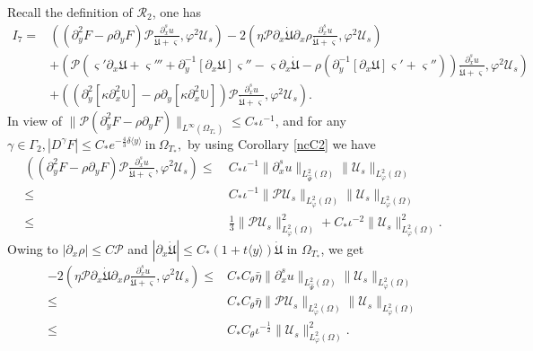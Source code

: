 \documentclass{amsart}
\numberwithin{equation}{section}
\newcommand\y{{{\langle y \rangle}}}
\begin{document}
Recall the definition of $\mathcal{R}_{2}$, one has
\begin{align}\label{I7}
I_{7}
=&\left((\partial_{y}^{2}F-\rho\partial_{y}F)\mathcal{P}\frac{\partial_{x}^{s}u}{\dot{\mathfrak{U}}+\varsigma},\varphi^{2}\mathcal{U}_{s}\right)
  -2\left(\eta\mathcal{P}\partial_{x}\dot{\mathfrak{U}}\partial_{x}\rho\frac{\partial_{x}^{s}u}{\dot{\mathfrak{U}}+\varsigma},\varphi^{2}\mathcal{U}_{s}\right)\\
 &+\left(\mathcal{P}\left(\varsigma'\partial_{x}\mathfrak{U}+\varsigma'''+\partial_{y}^{-1}[\partial_{x}\mathfrak{U}]\varsigma''-\varsigma\partial_{x}\dot{\mathfrak{U}}
  -\rho\left(\partial_{y}^{-1}[\partial_{x}\mathfrak{U}]\varsigma'+\varsigma''\right)\right)\frac{\partial_{x}^{s}u}{\dot{\mathfrak{U}}+\varsigma},\varphi^{2}\mathcal{U}_{s}\right)\nonumber\\
 &+\left((\partial_{y}^{2}[\kappa\partial_{x}^{2}\mathbb{U}]-\rho\partial_{y}[\kappa\partial_{x}^{2}\mathbb{U}])\mathcal{P}\frac{\partial_{x}^{s}u}{\dot{\mathfrak{U}}+\varsigma},\varphi^{2}\mathcal{U}_{s}\right).\nonumber
\end{align}
In view of $\|\mathcal{P}(\partial_{y}^{2}F-\rho\partial_{y}F)\|_{L^{\infty}(\Omega_{T_{*}})}\leq C_{*}\iota^{-1}$, and for any $\gamma\in\Gamma_{2}, |D^{\gamma}F|\leq C_{*}e^{-\frac{4}{3}\delta\y}~\text{in}~\Omega_{T_{*}},$
by using Corollary \ref{ncC2} we have
\begin{align}\label{I71}
\left((\partial_{y}^{2}F-\rho\partial_{y}F)\mathcal{P}\frac{\partial_{x}^{s}u}{\dot{\mathfrak{U}}+\varsigma},\varphi^{2}\mathcal{U}_{s}\right)
\leq&~C_{*}\iota^{-1}\|\partial_{x}^{s}u\|_{L_{\hat{\Psi}}^{2}(\Omega)}\|\mathcal{U}_{s}\|_{L_{\varphi}^{2}(\Omega)}\\
\leq&~C_{*}\iota^{-1}\|\mathcal{P}\mathcal{U}_{s}\|_{L_{\varphi}^{2}(\Omega)}\|\mathcal{U}_{s}\|_{L_{\varphi}^{2}(\Omega)}\nonumber\\
\leq&~\frac{1}{3}\|\mathcal{P}\mathcal{U}_{s}\|_{L_{\varphi}^{2}(\Omega)}^{2}
     +C_{*}\iota^{-2}\|\mathcal{U}_{s}\|_{L_{\varphi}^{2}(\Omega)}^{2}.\nonumber
\end{align}
Owing to $|\partial_{x}\rho|\leq C\mathcal{P}$ and $|\partial_{x}\dot{\mathfrak{U}}|\leq C_{*}(1+t\y)\dot{\mathfrak{U}}$ in $\Omega_{T_{*}}$, we get
\begin{align}\label{I72}
-2\left(\eta\mathcal{P}\partial_{x}\dot{\mathfrak{U}}\partial_{x}\rho\frac{\partial_{x}^{s}u}{\dot{\mathfrak{U}}+\varsigma},\varphi^{2}\mathcal{U}_{s}\right)
\leq& C_{*}C_{\theta}\bar{\eta}\|\partial_{x}^{s}u\|_{L_{\hat{\Psi}}^{2}(\Omega)}\|\mathcal{U}_{s}\|_{L_{\varphi}^{2}(\Omega)}\\
\leq& C_{*}C_{\theta}\bar{\eta}\|\mathcal{P}\mathcal{U}_{s}\|_{L_{\varphi}^{2}(\Omega)}\|\mathcal{U}_{s}\|_{L_{\varphi}^{2}(\Omega)}\nonumber\\
\leq& C_{*}C_{\theta}\iota^{-\frac{1}{2}}\|\mathcal{U}_{s}\|_{L_{\varphi}^{2}(\Omega)}^{2}.\nonumber
\end{align}
\end{document}
